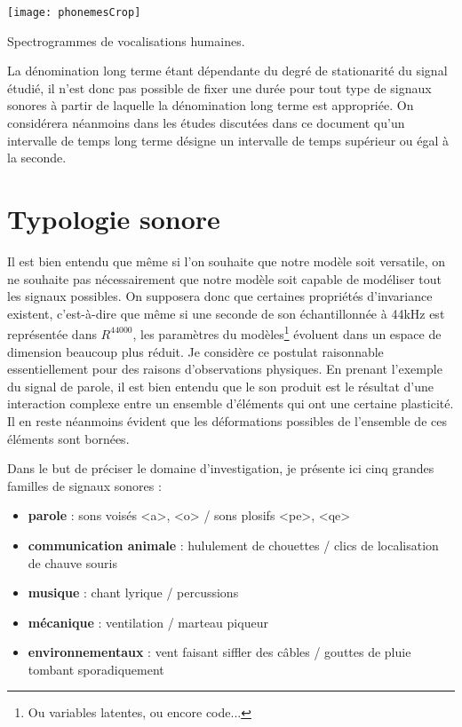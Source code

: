 \begin{marginfigure}
  \texttt{[image: phonemesCrop]}
  \caption{Spectrogrammes de vocalisations humaines.}
  \label{fig:speech} %
\end{marginfigure}

La dénomination \og long terme \fg  étant dépendante du degré de stationarité du signal étudié, il n'est donc pas possible de fixer une durée pour tout type de signaux sonores à partir de laquelle la dénomination \og long terme \fg est appropriée. On considérera néanmoins dans les études discutées dans ce document qu'un intervalle de temps  \og long terme \fg désigne un intervalle de temps supérieur ou égal à la seconde.

\section{ \nmu Typologie sonore} \label{sec:typologie}

Il est bien entendu que même si l'on souhaite que notre modèle soit versatile, on ne souhaite pas nécessairement que notre modèle soit capable de modéliser tout les signaux possibles. On supposera donc que certaines propriétés d'invariance existent, c'est-à-dire que même si une seconde de son échantillonnée à 44kHz est représentée dans $R^{44000}$, les paramètres du modèles\footnote{Ou variables latentes, ou encore code...} évoluent dans un espace de dimension beaucoup plus réduit. Je considère ce postulat raisonnable essentiellement pour des raisons d'observations physiques. En prenant l'exemple du signal de parole, il est bien entendu que le son produit est le résultat d'une interaction complexe entre un ensemble d'éléments qui ont une certaine plasticité. Il en reste néanmoins évident que les déformations possibles de l'ensemble de ces éléments sont bornées.

Dans le but de préciser le domaine d'investigation, je présente ici cinq grandes familles de signaux sonores :
\begin{itemize}
  \item \textbf{parole} : sons voisés <a>, <o> / sons plosifs <pe>, <qe>
  \item \textbf{communication animale} : hululement de chouettes / clics de localisation de chauve souris
  \item \textbf{musique} : chant lyrique / percussions
  \item \textbf{mécanique} : ventilation / marteau piqueur
  \item \textbf{environnementaux} : vent faisant siffler des câbles / gouttes de pluie tombant sporadiquement
\end{itemize}

